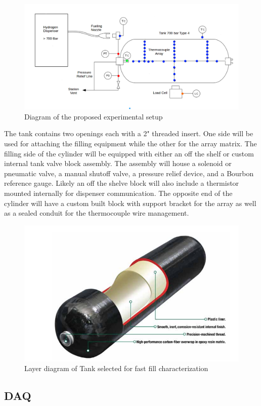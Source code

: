 \documentclass[paper=a4, fontsize=11pt, abstract=on]{scrartcl}
\numberwithin{equation}{section}		%
\numberwithin{figure}{section}			%
\numberwithin{table}{section}				%
\begin{document}
\begin{figure}[H]
\centering
\includegraphics[width=0.95\linewidth]{schem2}
\caption{Diagram of the proposed experimental setup}
\label{exp}
\end{figure}





The tank contains two openings each with a 2" threaded insert. One side will be used for attaching the filling equipment while the other for the array matrix. The filling side of the cylinder will be equipped with either an off the shelf or custom internal tank valve block assembly. The assembly will house a solenoid or pneumatic valve, a manual shutoff valve, a pressure relief device, and a Bourbon reference gauge. Likely an off the shelve block will also include a thermistor mounted internally for dispenser communication. The opposite end of the cylinder will have a custom built block with support bracket for the array as well as a sealed conduit for the thermocouple wire management.

\begin{figure}[H]
\centering
\includegraphics[width=0.6\linewidth]{tschem}
\caption{Layer diagram of Tank selected for fast fill characterization}
\label{tschem}
\end{figure}


\subsection{DAQ} 
\end{document}
